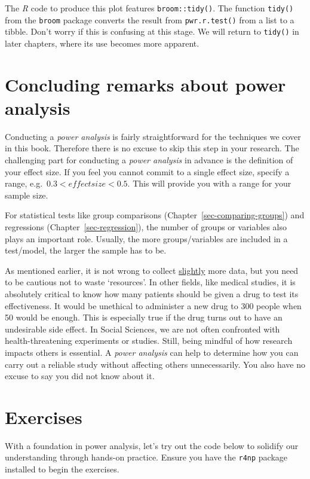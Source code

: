 \documentclass[
  letterpaper,
]{krantz}
\begin{document}
The \emph{R} code to produce this plot features \texttt{broom::tidy()}.
The function \texttt{tidy()} from the \texttt{broom} package converts
the result from \texttt{pwr.r.test()} from a list to a tibble. Don't
worry if this is confusing at this stage. We will return to
\texttt{tidy()} in later chapters, where its use becomes more apparent.

\section{Concluding remarks about power
analysis}\label{concluding-remarks-about-power-analysis}

Conducting a \emph{power analysis} is fairly straightforward for the
techniques we cover in this book. Therefore there is no excuse to skip
this step in your research. The challenging part for conducting a
\emph{power analysis} in advance is the definition of your effect size.
If you feel you cannot commit to a single effect size, specify a range,
e.g.~\(0.3 < effect size < 0.5\). This will provide you with a range for
your sample size.

For statistical tests like group comparisons
(Chapter~\ref{sec-comparing-groups}) and regressions
(Chapter~\ref{sec-regression}), the number of groups or variables also
plays an important role. Usually, the more groups/variables are included
in a test/model, the larger the sample has to be.

As mentioned earlier, it is not wrong to collect \ul{slightly} more
data, but you need to be cautious not to waste `resources'. In other
fields, like medical studies, it is absolutely critical to know how many
patients should be given a drug to test its effectiveness. It would be
unethical to administer a new drug to 300 people when 50 would be
enough. This is especially true if the drug turns out to have an
undesirable side effect. In Social Sciences, we are not often confronted
with health-threatening experiments or studies. Still, being mindful of
how research impacts others is essential. A \emph{power analysis} can
help to determine how you can carry out a reliable study without
affecting others unnecessarily. You also have no excuse to say you did
not know about it.

\section{Exercises}\label{sec-exercises-power-analysis}

With a foundation in power analysis, let's try out the code below to
solidify our understanding through hands-on practice. Ensure you have
the \texttt{r4np} package installed to begin the exercises.
\end{document}
